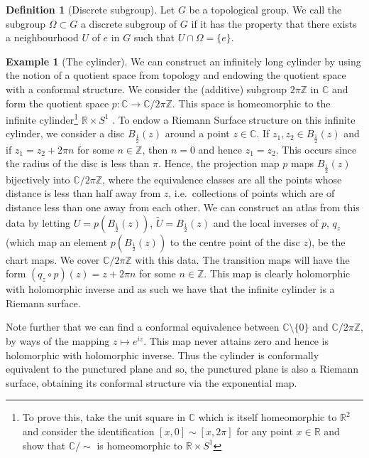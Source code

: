 \documentclass[11pt]{report}
\theoremstyle{definition}
\newtheorem{defn}[thm]{Definition}
\newtheorem*{example*}{Example}
\begin{document}
\begin{defn}[Discrete subgroup]
  Let $G$ be a topological group. We call the subgroup $\Omega \subset G$ a discrete subgroup of $G$ if it has the property that there exists a neighbourhood $U$ of $e$ in $G$ such that $U \cap \Omega = \{e\}$.
\end{defn}
\begin{example*}[The cylinder]
We can construct an infinitely long cylinder by using the notion of a quotient space from topology and endowing the quotient space with a conformal structure. We consider the (additive) subgroup $2\pi \mathbb{Z}$ in $\mathbb{C}$ and form the quotient space $p \colon \mathbb{C} \rightarrow \mathbb{C}/2\pi \mathbb{Z}$. This space is homeomorphic to the infinite cylinder\footnote{To prove this, take the unit square in $\mathbb{C}$ which is itself homeomorphic to $\mathbb{R}^2$ and consider the identification $[x,0] \sim [x,2\pi]$ for any point $x \in \mathbb{R}$ and show that $\mathbb{C}/\sim$ is homeomorphic to $\mathbb{R}\times S^1$} $\mathbb{R} \times S^1$ . To endow a Riemann Surface structure on this infinite cylinder, we consider a disc $B_{\frac{1}{2}}(z)$ around a point $z \in \mathbb{C}$. If $z_1, z_2 \in B_{\frac{1}{2}}(z)$ and if $z_1 = z_2 + 2\pi n$ for some $n \in \mathbb{Z}$, then $n=0$ and hence $z_1=z_2$. This occurs since the radius of the disc is less than $\pi$. Hence, the projection map $p$ maps $B_{\frac{1}{2}}(z)$ bijectively into $\mathbb{C}/2\pi\mathbb{Z}$, where the equivalence classes are all the points whose distance is less than half away from $z$, i.e.\ collections of points which are of distance less than one away from each other. We can construct an atlas from this data by letting $U = p(B_{\frac{1}{2}}(z))$, $\tilde{U} = B_{\frac{1}{2}}(z)$ and the local inverses of $p$, $q_z$ (which map an element $p(B_{\frac{1}{2}}(z))$ to the centre point of the disc $z$), be the chart maps. We cover $\mathbb{C}/2\pi\mathbb{Z}$ with this data. The transition maps will have the form $(q_z \circ p)(z) = z + 2\pi n$ for some $n \in \mathbb{Z}$. This map is clearly holomorphic with holomorphic inverse and as such we have that the infinite cylinder is a Riemann surface. 

Note further that we can find a conformal equivalence between $\mathbb{C}\setminus \{0\}$ and $\mathbb{C}/2\pi\mathbb{Z}$, by ways of the mapping $z \mapsto e^{iz}$. This map never attains zero and hence is holomorphic with holomorphic inverse. Thus the cylinder is conformally equivalent to the punctured plane and so, the punctured plane is also a Riemann surface, obtaining its conformal structure via the exponential map. 
\end{example*}
 
\end{document}

